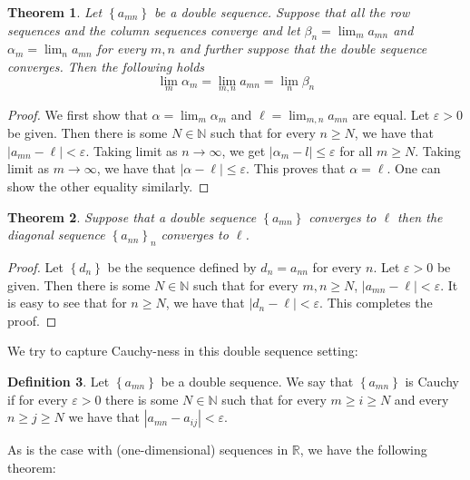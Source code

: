 \documentclass[12pt]{article}
\newtheorem{theorem}{Theorem}[subsection]
\theoremstyle{definition}
\newtheorem{definition}[theorem]{Definition}
\theoremstyle{remark}
\theoremstyle{plain}
\newcommand{\R}{\mathbb R}
\newcommand{\N}{\mathbb N}
\begin{document}
\begin{theorem}
    Let $\left\{ a_{mn} \right\}$ be a double sequence. Suppose that all the row sequences and the column sequences converge and let $\beta _n = \lim _m a_{mn}$ and $\alpha _m = \lim _n a_{mn}$ for every $m,n$ and further suppose that the double sequence converges. Then the following holds
    \begin{equation*}
	\lim_m \alpha_m = \lim_{m,n} a_{mn} = \lim_n \beta_n
    \end{equation*}
    \label{thm:1.1}
\end{theorem}
\begin{proof}
    We first show that $\alpha = \lim_m \alpha _m$ and $\ell = \lim_{m,n} a_{mn}$ are equal. Let $\varepsilon > 0$ be given. Then there is some $N\in \N$ such that for every $n\ge N$, we have that $|a_{mn} - \ell | < \varepsilon$. Taking limit as $n \to \infty$, we get $|\alpha _m - l | \le \varepsilon$ for all $m \ge N$. Taking limit as $m \to \infty$, we have that $| \alpha - \ell | \le \varepsilon $. This proves that $\alpha = \ell$. One can show the other equality similarly.
\end{proof}

\begin{theorem}
    Suppose that a double sequence $\left\{ a_{mn} \right\}$ converges to $\ell$ then the diagonal sequence $\left\{ a_{nn} \right\}_{n}$ converges to $\ell$.
    \label{thm:1.2}
\end{theorem}
\begin{proof}
    Let $\left\{ d_n \right\}$ be the sequence defined by $d_n = a_{nn}$ for every $n$. Let $\varepsilon > 0$ be given. Then there is some $N\in\N$ such that for every $m,n \ge N$, $|a_{mn}- \ell | <\varepsilon$. It is easy to see that for $n\ge N$, we have that $|d_n - \ell| < \varepsilon$. This completes the proof.
\end{proof}

We try to capture Cauchy-ness in this double sequence setting:

\begin{definition}
    Let $\left\{ a_{mn} \right\}$ be a double sequence. We say that $\left\{ a_{mn} \right\}$ is Cauchy if for every $\varepsilon > 0$ there is some $N \in \N$ such that for every $m\ge i \ge N$ and every $n\ge j \ge N$ we have that $|a_{mn}- a_{ij}| < \varepsilon$.
    \label{def:CauchyDoubleSeq}
\end{definition}

As is the case with (one-dimensional) sequences in $\R$, we have the following theorem:
\end{document}
